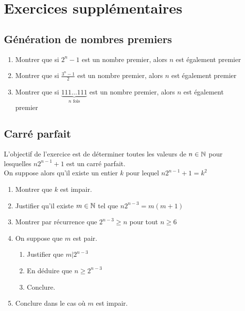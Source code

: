 \documentclass[oneside,12pt]{book}          %
\begin{document}
\section{Exercices supplémentaires}

\subsection{Génération de nombres premiers}

\begin{enumerate}
    \item Montrer que si $2^n-1$ est un nombre premier, alors $n$ est également premier
    \item Montrer que si $\frac{3^n-1}{2}$ est un nombre premier, alors $n$ est également premier
    \item Montrer que si $\underbrace{111\ldots111}_{n \text{ fois}}$ est un nombre premier, alors $n$ est également premier
\end{enumerate}



\subsection{Carré parfait}
L'objectif de l'exercice est de déterminer toutes les valeurs de $n\in{\mathbb N}$ pour lesquelles $n2^{n-1}+1$ est un carré parfait.\\
On suppose alors qu'il existe un entier $k$ pour lequel $n2^{n-1}+1=k^2$
\begin{enumerate}
	\item Montrer que $k$ est impair.
	\item Justifier qu'il existe $m\in{\mathbb N}$ tel que $n2^{n-3}=m(m+1)$
	\item Montrer par récurrence que $2^{n-3}\geq n$ pour tout $n\geq6$
	\item On suppose que $m$ est pair.
	\begin{enumerate}
		\item Justifier que $m\vert2^{n-3}$
		\item En déduire que $n\geq2^{n-3}$
		\item Conclure.
	\end{enumerate}
	\item Conclure dans le cas où $m$ est impair.
\end{enumerate}


\end{document}
